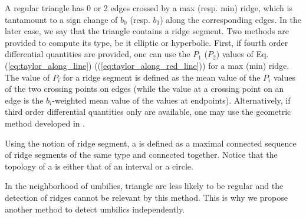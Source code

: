A regular triangle has 0 or 2 edges crossed by a max (resp. min)
ridge, which is tantamount to a sign change of $b_0$ (resp. $b_3$)
along the corresponding edges. In the later case, we say that the
triangle contains a ridge segment.
Two methods are provided to compute its type, be it elliptic or
hyperbolic. First, if fourth order differential quantities are
provided, one can use the $P_1$ ($P_2$) values of Eq.
(\ref{eq:taylor_along_line}) ((\ref{eq:taylor_along_red_line})) for a
max (min) ridge. The value of $P_i$ for a ridge segment is defined as
the mean value of the $P_i$ values of the two crossing points on edges
(while the value at a crossing point on an edge is the $b_i$-weighted
mean value of the values at endpoints).
Alternatively, if third order differential quantities only are
available, one may use the geometric method developed in
\cite{cgal:cp-tdare-05}.


Using the notion of ridge segment, a  is defined as a
maximal connected sequence of ridge segments of the same type and connected
together.  Notice that the topology of a  is either
that of an interval or a circle.

  In the neighborhood of umbilics,
triangle are less likely to be regular and the detection of ridges
cannot be relevant by this method.  This is why we propose another
method to detect umbilics independently.


